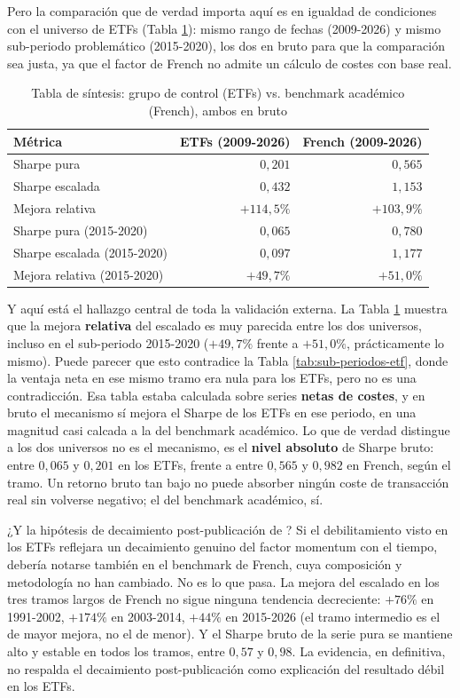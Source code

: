 \documentclass[12pt]{report} %
\begin{document}
Pero la comparación que de verdad importa aquí es en igualdad de condiciones con el universo de ETFs (Tabla \ref{tab:sintesis-final}): mismo rango de fechas (2009-2026) y mismo sub-periodo problemático (2015-2020), los dos en bruto para que la comparación sea justa, ya que el factor de French no admite un cálculo de costes con base real.

\begin{table}[H]
\centering
\caption{Tabla de síntesis: grupo de control (ETFs) vs. benchmark académico (French), ambos en bruto}
\label{tab:sintesis-final}
\begin{tabular}{|l|r|r|}
\hline
\textbf{Métrica} & \textbf{ETFs (2009-2026)} & \textbf{French (2009-2026)} \\
\hline
Sharpe pura & $0{,}201$ & $0{,}565$ \\
Sharpe escalada & $0{,}432$ & $1{,}153$ \\
Mejora relativa & $+114{,}5\%$ & $+103{,}9\%$ \\
Sharpe pura (2015-2020) & $0{,}065$ & $0{,}780$ \\
Sharpe escalada (2015-2020) & $0{,}097$ & $1{,}177$ \\
Mejora relativa (2015-2020) & $+49{,}7\%$ & $+51{,}0\%$ \\
\hline
\end{tabular}
\end{table}

Y aquí está el hallazgo central de toda la validación externa. La Tabla \ref{tab:sintesis-final} muestra que la mejora \textbf{relativa} del escalado es muy parecida entre los dos universos, incluso en el sub-periodo 2015-2020 ($+49{,}7\%$ frente a $+51{,}0\%$, prácticamente lo mismo). Puede parecer que esto contradice la Tabla \ref{tab:sub-periodos-etf}, donde la ventaja neta en ese mismo tramo era nula para los ETFs, pero no es una contradicción. Esa tabla estaba calculada sobre series \textbf{netas de costes}, y en bruto el mecanismo sí mejora el Sharpe de los ETFs en ese periodo, en una magnitud casi calcada a la del benchmark académico. Lo que de verdad distingue a los dos universos no es el mecanismo, es el \textbf{nivel absoluto} de Sharpe bruto: entre $0{,}065$ y $0{,}201$ en los ETFs, frente a entre $0{,}565$ y $0{,}982$ en French, según el tramo. Un retorno bruto tan bajo no puede absorber ningún coste de transacción real sin volverse negativo; el del benchmark académico, sí.

¿Y la hipótesis de decaimiento post-publicación de \citet{mcleanpontiff2016}? Si el debilitamiento visto en los ETFs reflejara un decaimiento genuino del factor momentum con el tiempo, debería notarse también en el benchmark de French, cuya composición y metodología no han cambiado. No es lo que pasa. La mejora del escalado en los tres tramos largos de French no sigue ninguna tendencia decreciente: $+76\%$ en 1991-2002, $+174\%$ en 2003-2014, $+44\%$ en 2015-2026 (el tramo intermedio es el de mayor mejora, no el de menor). Y el Sharpe bruto de la serie pura se mantiene alto y estable en todos los tramos, entre $0{,}57$ y $0{,}98$. La evidencia, en definitiva, no respalda el decaimiento post-publicación como explicación del resultado débil en los ETFs.
\end{document}
